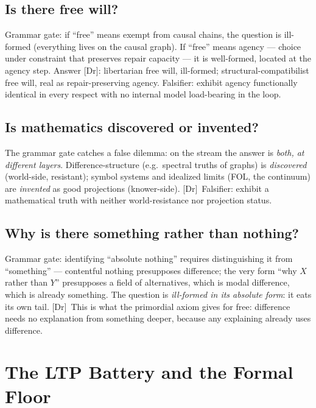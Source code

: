 \documentclass[11pt,a4paper,twoside]{book}
\newcommand{\tier}[1]{\textnormal{\small\textsf{[#1]}}}
\newcommand{\Dr}{\tier{Dr}}\newcommand{\Cj}{\tier{Cj}}\newcommand{\Wf}{\tier{Wf}}
\theoremstyle{plain}
\theoremstyle{definition}
\theoremstyle{remark}
\begin{document}
\section{Is there free will?}
Grammar gate: if ``free'' means exempt from causal chains, the question is
ill-formed (everything lives on the causal graph). If ``free'' means agency
--- choice under constraint that preserves repair capacity --- it is
well-formed, located at the agency step. Answer \Dr: libertarian free will,
ill-formed; structural-compatibilist free will, real as repair-preserving
agency. Falsifier: exhibit agency functionally identical in every respect
with no internal model load-bearing in the loop.

\section{Is mathematics discovered or invented?}
The grammar gate catches a false dilemma: on the stream the answer is
\emph{both, at different layers}. Difference-structure (e.g.\ spectral truths
of graphs) is \emph{discovered} (world-side, resistant); symbol systems and
idealized limits (FOL, the continuum) are \emph{invented} as good projections
(knower-side). \Dr\ Falsifier: exhibit a mathematical truth with neither
world-resistance nor projection status.

\section{Why is there something rather than nothing?}
Grammar gate: identifying ``absolute nothing'' requires distinguishing it
from ``something'' --- contentful nothing presupposes difference; the very
form ``why $X$ rather than $Y$'' presupposes a field of alternatives, which
is modal difference, which is already something. The question is
\emph{ill-formed in its absolute form}: it eats its own tail. \Dr\ This is
what the primordial axiom gives for free: difference needs no explanation
from something deeper, because any explaining already uses difference.

\chapter{The LTP Battery and the Formal Floor}
\end{document}
